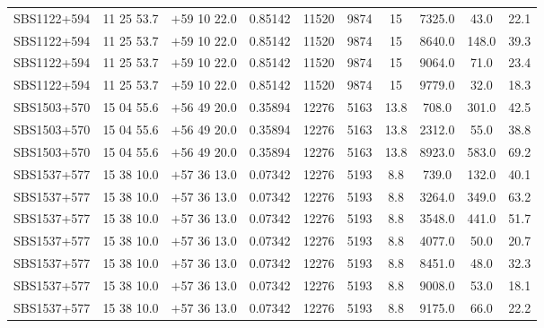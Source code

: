\begin{landscape}
\begin{center}
\begin{longtable}{l c c c c c c c c c}
SBS1122+594  &             11 25 53.7  &         $+$59 10 22.0  &       0.85142  & 11520  &   9874  &       15  &        7325.0  &  43.0  &   22.1  \\
SBS1122+594  &             11 25 53.7  &         $+$59 10 22.0  &       0.85142  & 11520  &   9874  &       15  &        8640.0  &  148.0  &  39.3  \\
SBS1122+594  &             11 25 53.7  &         $+$59 10 22.0  &       0.85142  & 11520  &   9874  &       15  &        9064.0  &  71.0  &   23.4  \\
SBS1122+594  &             11 25 53.7  &         $+$59 10 22.0  &       0.85142  & 11520  &   9874  &       15  &        9779.0  &  32.0  &   18.3  \\
SBS1503+570  &             15 04 55.6  &         $+$56 49 20.0  &       0.35894  & 12276  &   5163  &       13.8  &      708.0  &   301.0  &  42.5  \\
SBS1503+570  &             15 04 55.6  &         $+$56 49 20.0  &       0.35894  & 12276  &   5163  &       13.8  &      2312.0  &  55.0  &   38.8  \\
SBS1503+570  &             15 04 55.6  &         $+$56 49 20.0  &       0.35894  & 12276  &   5163  &       13.8  &      8923.0  &  583.0  &  69.2  \\
SBS1537+577  &             15 38 10.0  &         $+$57 36 13.0  &       0.07342  & 12276  &   5193  &       8.8  &       739.0  &   132.0  &  40.1  \\
SBS1537+577  &             15 38 10.0  &         $+$57 36 13.0  &       0.07342  & 12276  &   5193  &       8.8  &       3264.0  &  349.0  &  63.2  \\
SBS1537+577  &             15 38 10.0  &         $+$57 36 13.0  &       0.07342  & 12276  &   5193  &       8.8  &       3548.0  &  441.0  &  51.7  \\
SBS1537+577  &             15 38 10.0  &         $+$57 36 13.0  &       0.07342  & 12276  &   5193  &       8.8  &       4077.0  &  50.0  &   20.7  \\
SBS1537+577  &             15 38 10.0  &         $+$57 36 13.0  &       0.07342  & 12276  &   5193  &       8.8  &       8451.0  &  48.0  &   32.3  \\
SBS1537+577  &             15 38 10.0  &         $+$57 36 13.0  &       0.07342  & 12276  &   5193  &       8.8  &       9008.0  &  53.0  &   18.1  \\
SBS1537+577  &             15 38 10.0  &         $+$57 36 13.0  &       0.07342  & 12276  &   5193  &       8.8  &       9175.0  &  66.0  &   22.2  \\

\end{longtable}
\end{center}
\end{landscape}
